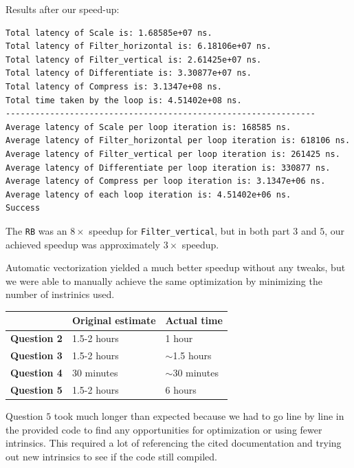 \documentclass[
  course = {{ESE532 System-on-a-Chip}},
  quartile = {{}},
  assignment = 4,
  name = {{Sheil Sarda, Kate Ballard}},
  studentnumber = {{}},
  email = {{sheils@seas.upenn.edu, kballard@seas.upenn.edu}},
  firstexercise = 1
]{aga-homework}
\begin{document}
\subexercise

Results after our speed-up:
\begin{verbatim}
Total latency of Scale is: 1.68585e+07 ns.
Total latency of Filter_horizontal is: 6.18106e+07 ns.
Total latency of Filter_vertical is: 2.61425e+07 ns.
Total latency of Differentiate is: 3.30877e+07 ns.
Total latency of Compress is: 3.1347e+08 ns.
Total time taken by the loop is: 4.51402e+08 ns.
---------------------------------------------------------------
Average latency of Scale per loop iteration is: 168585 ns.
Average latency of Filter_horizontal per loop iteration is: 618106 ns.
Average latency of Filter_vertical per loop iteration is: 261425 ns.
Average latency of Differentiate per loop iteration is: 330877 ns.
Average latency of Compress per loop iteration is: 3.1347e+06 ns.
Average latency of each loop iteration is: 4.51402e+06 ns.
Success
\end{verbatim}

\subexercise
The \verb|RB| was an $8\times$ speedup for \verb|Filter_vertical|, but in both part $3$ and $5$, our achieved speedup was approximately $3\times$ speedup.  

\subexercise
Automatic vectorization yielded a much better speedup without any tweaks, but we were able to manually achieve the same optimization by minimizing the number of instrinics used.

\exercise
\subexercise
\begin{table}[h]
	\begin{tabular}{|l|l|l|}
		\hline
		& \textbf{Original estimate} & \textbf{Actual time} \\ \hline
		\textbf{Question 2} & 1.5-2 hours                & 1 hour               \\ \hline
		\textbf{Question 3} & 1.5-2 hours                & $\sim$1.5 hours      \\ \hline
		\textbf{Question 4} & 30 minutes                 & $\sim$30 minutes     \\ \hline
		\textbf{Question 5} & 1.5-2 hours                & 6 hours              \\ \hline
	\end{tabular}
\end{table}
Question $5$ took much longer than expected because we had to go line by line in the provided code to find any opportunities for optimization or using fewer intrinsics. This required a lot of referencing the cited documentation and trying out new intrinsics to see if the code still compiled.
\end{document}

